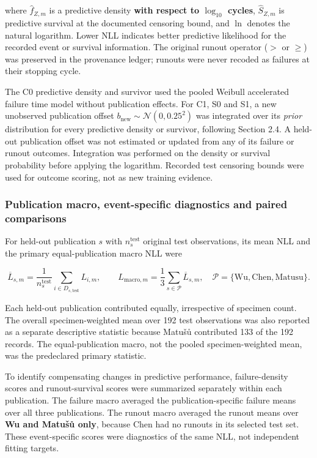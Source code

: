 \documentclass[12pt,a4paper]{article}
\begin{document}
where \(\widehat f_{Z,m}\) is a predictive density \textbf{with respect to \(\log_{10}\) cycles}, \(\widehat S_{Z,m}\) is predictive survival at the documented censoring bound, and \(\ln\) denotes the natural logarithm. Lower NLL indicates better predictive likelihood for the recorded event or survival information. The original runout operator (\(>\) or \(\geq\)) was preserved in the provenance ledger; runouts were never recoded as failures at their stopping cycle.

The C0 predictive density and survivor used the pooled Weibull accelerated failure time model without publication effects. For C1, S0 and S1, a new unobserved publication offset \(b_{\mathrm{new}}\sim\mathcal N(0,0.25^2)\) was integrated over its \emph{prior} distribution for every predictive density or survivor, following Section 2.4. A held-out publication offset was not estimated or updated from any of its failure or runout outcomes. Integration was performed on the density or survival probability before applying the logarithm. Recorded test censoring bounds were used for outcome scoring, not as new training evidence.

\subsubsection{Publication macro, event-specific diagnostics and paired comparisons}

For held-out publication \(s\) with \(n_s^{\mathrm{test}}\) original test observations, its mean NLL and the primary equal-publication macro NLL were

\begin{equation}
\overline L_{s,m}
=\frac{1}{n_s^{\mathrm{test}}}\sum_{i\in D_{s,\mathrm{test}}}L_{i,m},
\qquad
L_{\mathrm{macro},m}
=\frac{1}{3}\sum_{s\in\mathcal P}\overline L_{s,m},
\quad \mathcal P=\{\mathrm{Wu,Chen,Matusu}\}.
\tag{2.6b}
\end{equation}

Each held-out publication contributed equally, irrespective of specimen count. The overall specimen-weighted mean over 192 test observations was also reported as a separate descriptive statistic because Matušů contributed 133 of the 192 records. The equal-publication macro, not the pooled specimen-weighted mean, was the predeclared primary statistic.

To identify compensating changes in predictive performance, failure-density scores and runout-survival scores were summarized separately within each publication. The failure macro averaged the publication-specific failure means over all three publications. The runout macro averaged the runout means over \textbf{Wu and Matušů only}, because Chen had no runouts in its selected test set. These event-specific scores were diagnostics of the same NLL, not independent fitting targets.
\end{document}
